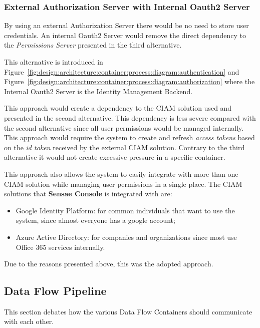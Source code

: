 \subsubsection{External Authorization Server with Internal Oauth2 Server}
\label{subsubsec:design:alternatives:auth:externalauthinternaloauth}

By using an external Authorization Server there would be no need to store user credentials. An internal Oauth2 Server would remove the direct dependency to the \textit{Permissions Server} presented in the third alternative.

This alternative is introduced in Figure~\ref{fig:design:architecture:container:process:diagram:authentication} and Figure~\ref{fig:design:architecture:container:process:diagram:authorization} where the Internal Oauth2 Server is the Identity Management Backend.

This approach would create a dependency to the \gls{CIAM} solution used and presented in the second alternative. This dependency is less severe compared with the second alternative since all user permissions would be managed internally.
This approach would require the system to create and refresh \textit{access tokens} based on the \textit{id token} received by the external \gls{CIAM} solution. Contrary to the third alternative it would not create excessive pressure in a specific container.

This approach also allows the system to easily integrate with more than one \gls{CIAM} solution while managing user permissions in a single place. The \gls{CIAM} solutions that \textbf{Sensae Console} is integrated with are:

\begin{itemize}
   \item Google Identity Platform: for common individuals that want to use the system, since almost everyone has a google account; 
   \item Azure Active Directory: for companies and organizations since most use Office 365 services internally.
\end{itemize}

Due to the reasons presented above, this was the adopted approach.

\subsection{Data Flow Pipeline}
\label{subsec:design:alternatives:flow}

This section debates how the various Data Flow Containers should communicate with each other. 

